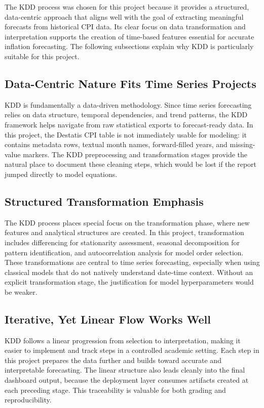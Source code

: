 The KDD process was chosen for this project because it provides a structured, data-centric approach that aligns well with the goal of extracting meaningful forecasts from historical CPI data. Its clear focus on data transformation and interpretation supports the creation of time-based features essential for accurate inflation forecasting. The following subsections explain why KDD is particularly suitable for this project.

\subsection{Data-Centric Nature Fits Time Series Projects}

KDD is fundamentally a data-driven methodology. Since time series forecasting relies on data structure, temporal dependencies, and trend patterns, the KDD framework helps navigate from raw statistical exports to forecast-ready data. In this project, the Destatis CPI table is not immediately usable for modeling: it contains metadata rows, textual month names, forward-filled years, and missing-value markers. The KDD preprocessing and transformation stages provide the natural place to document these cleaning steps, which would be lost if the report jumped directly to model equations.

\subsection{Structured Transformation Emphasis}

The KDD process places special focus on the transformation phase, where new features and analytical structures are created. In this project, transformation includes differencing for stationarity assessment, seasonal decomposition for pattern identification, and autocorrelation analysis for model order selection. These transformations are central to time series forecasting, especially when using classical models that do not natively understand date-time context. Without an explicit transformation stage, the justification for model hyperparameters would be weaker.

\subsection{Iterative, Yet Linear Flow Works Well}

KDD follows a linear progression from selection to interpretation, making it easier to implement and track steps in a controlled academic setting. Each step in this project prepares the data further and builds toward accurate and interpretable forecasting. The linear structure also leads cleanly into the final dashboard output, because the deployment layer consumes artifacts created at each preceding stage. This traceability is valuable for both grading and reproducibility.

